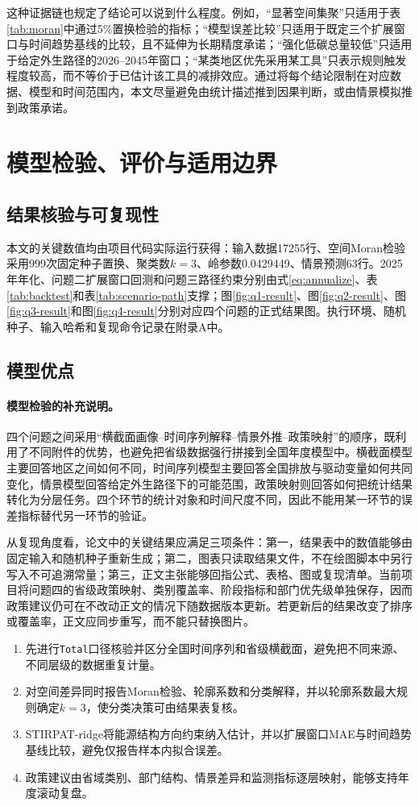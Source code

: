 \documentclass[12pt,a4paper]{ctexart}
\theoremstyle{definition}
\theoremstyle{plain}
\theoremstyle{remark}
\begin{document}
这种证据链也规定了结论可以说到什么程度。例如，“显著空间集聚”只适用于表\ref{tab:moran}中通过5\%置换检验的指标；“模型误差比较”只适用于既定三个扩展窗口与时间趋势基线的比较，且不延伸为长期精度承诺；“强化低碳总量较低”只适用于给定外生路径的2026--2045年窗口；“某类地区优先采用某工具”只表示规则触发程度较高，而不等价于已估计该工具的减排效应。通过将每个结论限制在对应数据、模型和时间范围内，本文尽量避免由统计描述推到因果判断，或由情景模拟推到政策承诺。
\section{模型检验、评价与适用边界}

\subsection{结果核验与可复现性}
本文的关键数值均由项目代码实际运行获得：输入数据17255行、空间Moran检验采用999次固定种子置换、聚类数$k=3$、岭参数0.0429449、情景预测63行。2025年年化、问题二扩展窗口回测和问题三路径约束分别由式\eqref{eq:annualize}、表\ref{tab:backtest}和表\ref{tab:scenario-path}支撑；图\ref{fig:q1-result}、图\ref{fig:q2-result}、图\ref{fig:q3-result}和图\ref{fig:q4-result}分别对应四个问题的正式结果图。执行环境、随机种子、输入哈希和复现命令记录在附录A中。

\subsection{模型优点}\paragraph{模型检验的补充说明。}
四个问题之间采用“横截面画像--时间序列解释--情景外推--政策映射”的顺序，既利用了不同附件的优势，也避免把省级数据强行拼接到全国年度模型中。横截面模型主要回答地区之间如何不同，时间序列模型主要回答全国排放与驱动变量如何共同变化，情景模型回答给定外生路径下的可能范围，政策映射则回答如何把统计结果转化为分层任务。四个环节的统计对象和时间尺度不同，因此不能用某一环节的误差指标替代另一环节的验证。

从复现角度看，论文中的关键结果应满足三项条件：第一，结果表中的数值能够由固定输入和随机种子重新生成；第二，图表只读取结果文件，不在绘图脚本中另行写入不可追溯常量；第三，正文主张能够回指公式、表格、图或复现清单。当前项目将问题四的省级政策映射、类别覆盖率、阶段指标和部门优先级单独保存，因而政策建议仍可在不改动正文的情况下随数据版本更新。若更新后的结果改变了排序或覆盖率，正文应同步重写，而不能只替换图片。
\begin{enumerate}[label=(\arabic*)]
\item 先进行\texttt{Total}口径核验并区分全国时间序列和省级横截面，避免把不同来源、不同层级的数据重复计量。
\item 对空间差异同时报告Moran检验、轮廓系数和分类解释，并以轮廓系数最大规则确定$k=3$，使分类决策可由结果表复核。
\item STIRPAT-ridge将能源结构方向约束纳入估计，并以扩展窗口MAE与时间趋势基线比较，避免仅报告样本内拟合误差。
\item 政策建议由省域类别、部门结构、情景差异和监测指标逐层映射，能够支持年度滚动复盘。
\end{enumerate}
\end{document}
